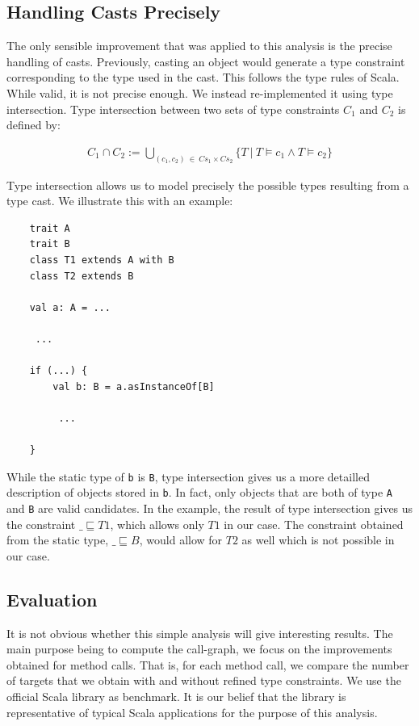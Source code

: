 \documentclass[a4paper]{article}
\newcommand{\subtypeeq}{\sqsubseteq}
\begin{document}
\subsection{Handling Casts Precisely}
The only sensible improvement that was applied to this analysis is the precise
handling of casts. Previously, casting an object would generate a type
constraint corresponding to the type used in the cast. This follows the type
rules of Scala. While valid, it is not precise enough. We instead
re-implemented it using type intersection. Type intersection between two sets
of type constraints $C_1$ and $C_2$ is defined by:

\begin{eqnarray*}
        C_1 \cap C_2 := \bigcup_{(c_1,c_2) ~ \in ~ Cs_1 \times Cs_2} \{ T ~|~ T \models c_1 \land T \models c_2  \}
\end{eqnarray*}

Type intersection allows us to model precisely the possible types resulting
from a type cast. We illustrate this with an example:


\begin{lstlisting}
    trait A
    trait B
    class T1 extends A with B
    class T2 extends B

    val a: A = ...

     ...

    if (...) {
        val b: B = a.asInstanceOf[B]

         ...

    }
\end{lstlisting}


While the static type of \verb=b= is \verb=B=, type intersection gives us a
more detailled description of objects stored in \verb=b=. In fact, only objects that
are both of type \verb=A= and \verb=B= are valid candidates. In the example,
the result of type intersection gives us the constraint $\_ \subtypeeq T1$,
which allows only $T1$ in our case. The constraint obtained from the static
type, $\_ \subtypeeq B$, would allow for $T2$ as well which is not possible in
our case.

\subsection{Evaluation}
It is not obvious whether this simple analysis will give interesting results.
The main purpose being to compute the call-graph, we focus on the improvements
obtained for method calls. That is, for each method call, we compare the number
of targets that we obtain with and without refined type constraints. We use the
official Scala library as benchmark. It is our belief that the library is
representative of typical Scala applications for the purpose of this analysis.
\end{document}
